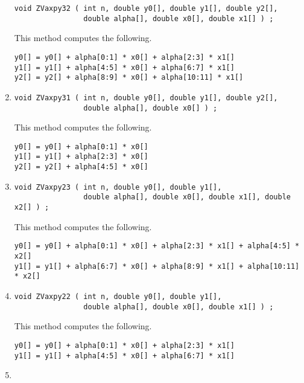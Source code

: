 \begin{enumerate}
\begin{verbatim}
void ZVaxpy32 ( int n, double y0[], double y1[], double y2[], 
                double alpha[], double x0[], double x1[] ) ;
\end{verbatim}
This method computes the following.
\begin{verbatim}
y0[] = y0[] + alpha[0:1] * x0[] + alpha[2:3] * x1[] 
y1[] = y1[] + alpha[4:5] * x0[] + alpha[6:7] * x1[] 
y2[] = y2[] + alpha[8:9] * x0[] + alpha[10:11] * x1[] 
\end{verbatim}
\item
\begin{verbatim}
void ZVaxpy31 ( int n, double y0[], double y1[], double y2[], 
                double alpha[], double x0[] ) ;
\end{verbatim}
This method computes the following.
\begin{verbatim}
y0[] = y0[] + alpha[0:1] * x0[] 
y1[] = y1[] + alpha[2:3] * x0[] 
y2[] = y2[] + alpha[4:5] * x0[] 
\end{verbatim}
\item
\begin{verbatim}
void ZVaxpy23 ( int n, double y0[], double y1[], 
                double alpha[], double x0[], double x1[], double x2[] ) ;
\end{verbatim}
This method computes the following.
\begin{verbatim}
y0[] = y0[] + alpha[0:1] * x0[] + alpha[2:3] * x1[] + alpha[4:5] * x2[]
y1[] = y1[] + alpha[6:7] * x0[] + alpha[8:9] * x1[] + alpha[10:11] * x2[]
\end{verbatim}
\item
\begin{verbatim}
void ZVaxpy22 ( int n, double y0[], double y1[], 
                double alpha[], double x0[], double x1[] ) ;
\end{verbatim}
This method computes the following.
\begin{verbatim}
y0[] = y0[] + alpha[0:1] * x0[] + alpha[2:3] * x1[] 
y1[] = y1[] + alpha[4:5] * x0[] + alpha[6:7] * x1[] 
\end{verbatim}
\item

\end{enumerate}
